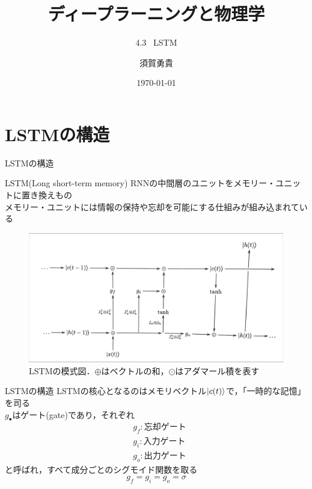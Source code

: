 \documentclass[dvipdfmx,8pt]{beamer}
\title{ディープラーニングと物理学}
\subtitle{4.3 \ LSTM}
\author[須賀]{須賀勇貴}
\institute[茨大]{茨城大学大学院 \ 理工学研究科 \ 量子線科学専攻 \ 2年}
\date{\today}
\begin{document}
\frame{\maketitle}
  \section{LSTMの構造}
  \begin{frame}{LSTMの構造}
    \begin{block}{LSTM(Long short-term memory)}
      RNNの中間層のユニットをメモリー・ユニットに置き換えもの\\
      メモリー・ユニットには情報の保持や忘却を可能にする仕組みが組み込まれている      
    \end{block}
    \begin{figure}
      \begin{center}
        \includegraphics[height=5.7cm]{image/LSTM_diagram.jpeg}
      \end{center}
      \caption{LSTMの模式図．$\oplus$はベクトルの和，$\odot$はアダマール積を表す}
    \end{figure}
  \end{frame}

  \begin{frame}{LSTMの構造}
    LSTMの核心となるのはメモリベクトル$\ket{c(t)}$で，「一時的な記憶」を司る\\
    \vspace{0.3cm}
    $g_{\bullet}$はゲート(gate)であり，それぞれ
    \begin{align*}
      & g_f : \text{忘却ゲート}\\
      & g_i : \text{入力ゲート}\\
      & g_o : \text{出力ゲート}
    \end{align*}
    と呼ばれ，すべて成分ごとのシグモイド関数を取る
    \begin{equation*}
      g_f = g_i = g_o = \sigma
    \end{equation*}
  \end{frame}
\end{document}
